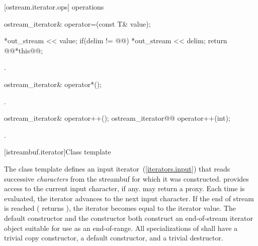 [ostream.iterator.ops]{ operations}

%
%
\begin{itemdecl}
ostream_iterator& operator=(const T& value);
\end{itemdecl}

\begin{itemdescr}
\pnum
\effects {}
\begin{codeblock}
*out_stream << value;
if(delim != @@)
  *out_stream << delim;
return @\oldtxt{(}@*this@\oldtxt{)}@;
\end{codeblock}

{\color{oldclr}
\pnum
\requires {}.
} %
\end{itemdescr}

%
%
\begin{itemdecl}
ostream_iterator& operator*();
\end{itemdecl}

\begin{itemdescr}
\pnum
\returns
{}.
\end{itemdescr}

%
%
\begin{itemdecl}
ostream_iterator& operator++();
ostream_iterator@\oldoldtxt{\&}@ operator++(int);
\end{itemdecl}

\begin{itemdescr}
\pnum
\returns
{}.
\end{itemdescr}

[istreambuf.iterator]{Class template }

\pnum
The
class template
defines an input iterator~(\ref{iterators.input}) that
reads successive
\textit{characters}
from the streambuf for which it was constructed.
provides access to the current input character, if any.
\enternote {} may return a proxy. \exitnote
Each time
is evaluated, the iterator advances to the next input character.
If the end of stream is reached ( returns
),
the iterator becomes equal to the
iterator value.
The default constructor
and the constructor
both construct an end-of-stream iterator object suitable for use
as an end-of-range.
All specializations of  shall have a trivial copy
constructor, a  default constructor, and a trivial destructor.

